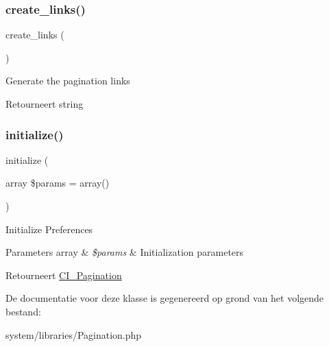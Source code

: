 \subsubsection{\texorpdfstring{create\_links()}{create\_links()}}
{\footnotesize\ttfamily create\+\_\+links (\begin{DoxyParamCaption}{ }\end{DoxyParamCaption})}

Generate the pagination links

\begin{DoxyReturn}{Retourneert}
string 
\end{DoxyReturn}
\mbox{\label{class_c_i___pagination_a37ac2c18c8af8852be6947397aa92275}} 
\subsubsection{\texorpdfstring{initialize()}{initialize()}}
{\footnotesize\ttfamily initialize (\begin{DoxyParamCaption}\item[{array}]{\$params = {\ttfamily array()} }\end{DoxyParamCaption})}

Initialize Preferences


\begin{DoxyParams}[1]{Parameters}
array & {\em \$params} & Initialization parameters \\
\hline
\end{DoxyParams}
\begin{DoxyReturn}{Retourneert}
\mbox{\hyperlink{class_c_i___pagination}{C\+I\+\_\+\+Pagination}} 
\end{DoxyReturn}


De documentatie voor deze klasse is gegenereerd op grond van het volgende bestand\+:\begin{DoxyCompactItemize}
\item 
system/libraries/Pagination.\+php\end{DoxyCompactItemize}
